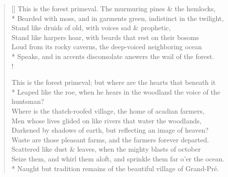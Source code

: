 \documentclass[MAIN]{subfiles}
\begin{document}
\settowidth{\versewidth}{This is the forest primeval. The murmuring pines \& the hemlocks,}
\begin{verse}[\versewidth]
This is the forest primeval. The murmuring pines \& the hemlocks,\\*
Bearded with moss, and in garments green, indistinct in the twilight,\\
Stand like druids of old, with voices sad \& prophetic,\\
Stand like harpers hoar, with beards that rest on their bosoms\\
Loud from its rocky caverns, the deep-voiced neighboring ocean\\*
Speaks, and in accents disconsolate answers the wail of the forest.\\!

This is the forest primeval; but where are the hearts that beneath it\\*
Leaped like the roe, when he hears in the woodland the voice of the huntsman?\\
Where is the thatch-roofed village, the home of acadian farmers,\\
Men whose lives glided on like rivers that water the woodlands,\\
Darkened by shadows of earth, but reflecting an image of heaven?\\
Waste are those pleasant farms, and the farmers forever departed.\\
Scattered like dust \& leaves, when the mighty blasts of october\\
Seize them, and whirl them aloft, and sprinkle them far o'er the ocean.\\*
Naught but tradition remains of the beautiful village of {\sc Grand-Pr\'e}.
\end{verse}
\end{document}
